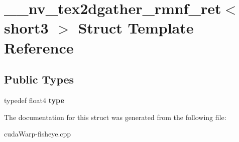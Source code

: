 \hypertarget{struct____nv__tex2dgather__rmnf__ret_3_01short3_01_4}{}\section{\+\_\+\+\_\+nv\+\_\+tex2dgather\+\_\+rmnf\+\_\+ret$<$ short3 $>$ Struct Template Reference}
\label{struct____nv__tex2dgather__rmnf__ret_3_01short3_01_4}
\subsection*{Public Types}
\begin{DoxyCompactItemize}
\item 
typedef float4 {\bfseries type}\hypertarget{struct____nv__tex2dgather__rmnf__ret_3_01short3_01_4_ab5f656fed0de13ac0b0848131b47e43b}{}\label{struct____nv__tex2dgather__rmnf__ret_3_01short3_01_4_ab5f656fed0de13ac0b0848131b47e43b}

\end{DoxyCompactItemize}


The documentation for this struct was generated from the following file\+:\begin{DoxyCompactItemize}
\item 
cuda\+Warp-\/fisheye.\+cpp\end{DoxyCompactItemize}
